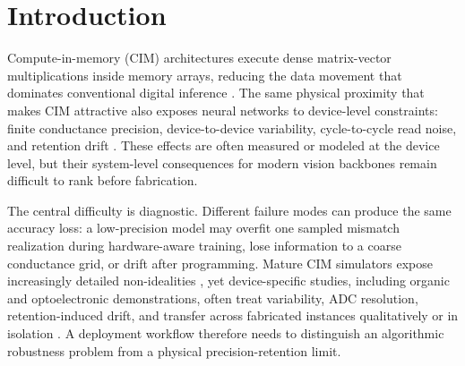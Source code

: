 \section{Introduction}
\label{sec:introduction}

Compute-in-memory (CIM) architectures execute dense matrix-vector multiplications inside memory arrays, reducing the data movement that dominates conventional digital inference \citep{horowitz2014computing,peng2020dnnneurosim,lanza2025memristor}. The same physical proximity that makes CIM attractive also exposes neural networks to device-level constraints: finite conductance precision, device-to-device variability, cycle-to-cycle read noise, and retention drift \citep{rasch2021aihwkit,crosssim2024,xu2025emerging,guo2024organic,photonics2025organicreview}. These effects are often measured or modeled at the device level, but their system-level consequences for modern vision backbones remain difficult to rank before fabrication.

The central difficulty is diagnostic. Different failure modes can produce the same accuracy loss: a low-precision model may overfit one sampled mismatch realization during hardware-aware training, lose information to a coarse conductance grid, or drift after programming. Mature CIM simulators expose increasingly detailed non-idealities \citep{peng2020dnnneurosim,lammie2022memtorch,rasch2021aihwkit,crosssim2024}, yet device-specific studies, including organic and optoelectronic demonstrations, often treat variability, ADC resolution, retention-induced drift, and transfer across fabricated instances qualitatively or in isolation \citep{zeng2023organicmemristor,jung2024organicfilaments,lin2016physical}. A deployment workflow therefore needs to distinguish an algorithmic robustness problem from a physical precision-retention limit.

